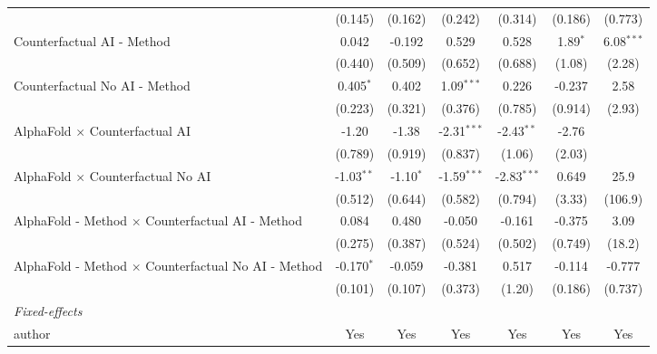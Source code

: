\begin{tabular}{lcccccc}
                                                              & (0.145)       & (0.162)       & (0.242)       & (0.314)       & (0.186)    & (0.773)\\   
   Counterfactual AI - Method                                 & 0.042         & -0.192        & 0.529         & 0.528         & 1.89$^{*}$ & 6.08$^{***}$\\   
                                                              & (0.440)       & (0.509)       & (0.652)       & (0.688)       & (1.08)     & (2.28)\\   
   Counterfactual No AI - Method                              & 0.405$^{*}$   & 0.402         & 1.09$^{***}$  & 0.226         & -0.237     & 2.58\\   
                                                              & (0.223)       & (0.321)       & (0.376)       & (0.785)       & (0.914)    & (2.93)\\   
   AlphaFold $\times$ Counterfactual AI                       & -1.20         & -1.38         & -2.31$^{***}$ & -2.43$^{**}$  & -2.76      &   \\   
                                                              & (0.789)       & (0.919)       & (0.837)       & (1.06)        & (2.03)     &   \\   
   AlphaFold $\times$ Counterfactual No AI                    & -1.03$^{**}$  & -1.10$^{*}$   & -1.59$^{***}$ & -2.83$^{***}$ & 0.649      & 25.9\\   
                                                              & (0.512)       & (0.644)       & (0.582)       & (0.794)       & (3.33)     & (106.9)\\   
   AlphaFold - Method $\times$ Counterfactual AI - Method     & 0.084         & 0.480         & -0.050        & -0.161        & -0.375     & 3.09\\   
                                                              & (0.275)       & (0.387)       & (0.524)       & (0.502)       & (0.749)    & (18.2)\\   
   AlphaFold - Method $\times$ Counterfactual No AI - Method  & -0.170$^{*}$  & -0.059        & -0.381        & 0.517         & -0.114     & -0.777\\   
                                                              & (0.101)       & (0.107)       & (0.373)       & (1.20)        & (0.186)    & (0.737)\\   
   \midrule
   \emph{Fixed-effects}\\
   author                                                     & Yes           & Yes           & Yes           & Yes           & Yes        & Yes\\  

\end{tabular}
